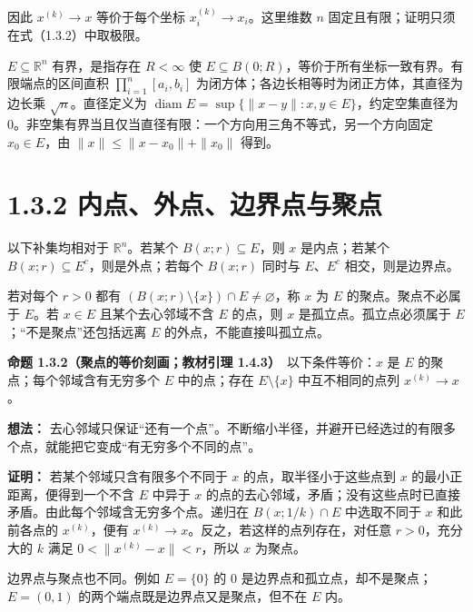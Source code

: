 \documentclass[11pt,a4paper]{article}
\begin{document}
因此 \(x^{(k)}\to x\) 等价于每个坐标 \(x_i^{(k)}\to x_i\)。这里维数
\(n\) 固定且有限；证明只须在式（1.3.2）中取极限。

\(E\subseteq\mathbb R^n\) 有界，是指存在 \(R<\infty\) 使
\(E\subseteq B(0;R)\)，等价于所有坐标一致有界。有限端点的区间直积
\(\prod_{i=1}^n[a_i,b_i]\)
为闭方体；各边长相等时为闭正方体，其直径为边长乘 \(\sqrt n\)。直径定义为
\(\operatorname{diam}E=\sup\{\|x-y\|:x,y\in E\}\)，约定空集直径为
\(0\)。非空集有界当且仅当直径有限：一个方向用三角不等式，另一个方向固定
\(x_0\in E\)，由 \(\|x\|\leq\|x-x_0\|+\|x_0\|\) 得到。

\section[\S{}1.3.2
内点、外点、边界点与聚点]{1.3.2
内点、外点、边界点与聚点}\label{ux5185ux70b9ux5916ux70b9ux8fb9ux754cux70b9ux4e0eux805aux70b9}

以下补集均相对于 \(\mathbb R^n\)。若某个 \(B(x;r)\subseteq E\)，则 \(x\)
是内点；若某个 \(B(x;r)\subseteq E^c\)，则是外点；若每个 \(B(x;r)\)
同时与 \(E\)、\(E^c\) 相交，则是边界点。

若对每个 \(r>0\) 都有 \((B(x;r)\setminus\{x\})\cap E\ne\varnothing\)，称
\(x\) 为 \(E\) 的聚点。聚点不必属于 \(E\)。若 \(x\in E\)
且某个去心邻域不含 \(E\) 的点，则 \(x\) 是孤立点。孤立点必须属于
\(E\)；``不是聚点''还包括远离 \(E\) 的外点，不能直接叫孤立点。

\textbf{命题 1.3.2（聚点的等价刻画；教材引理
1.4.3）}　以下条件等价：\(x\) 是 \(E\) 的聚点；每个邻域含有无穷多个
\(E\) 中的点；存在 \(E\setminus\{x\}\) 中互不相同的点列
\(x^{(k)}\to x\)。

\textbf{想法：}
去心邻域只保证``还有一个点''。不断缩小半径，并避开已经选过的有限多个点，就能把它变成``有无穷多个不同的点''。

\textbf{证明：} 若某个邻域只含有限多个不同于 \(x\)
的点，取半径小于这些点到 \(x\) 的最小正距离，便得到一个不含 \(E\) 中异于
\(x\)
的点的去心邻域，矛盾；没有这些点时已直接矛盾。由此每个邻域含无穷多个点。递归在
\(B(x;1/k)\cap E\) 中选取不同于 \(x\) 和此前各点的 \(x^{(k)}\)，便有
\(x^{(k)}\to x\)。反之，若这样的点列存在，对任意 \(r>0\)，充分大的 \(k\)
满足 \(0<\|x^{(k)}-x\|<r\)，所以 \(x\) 为聚点。

边界点与聚点也不同。例如 \(E=\{0\}\) 的 \(0\)
是边界点和孤立点，却不是聚点；\(E=(0,1)\)
的两个端点既是边界点又是聚点，但不在 \(E\) 内。
\end{document}
